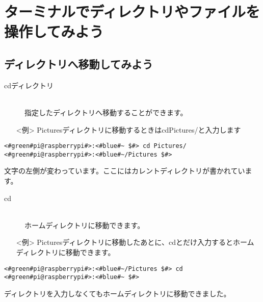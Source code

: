 \section{ターミナルでディレクトリやファイルを操作してみよう}

\subsection{ディレクトリへ移動してみよう}
\begin{description}
\item[cd\textvisiblespace ディレクトリ]\mbox{}\\
指定したディレクトリへ移動することができます。
\end{description}
\begin{itemize}
\item[<例>] Picturesディレクトリに移動するときはcd\textvisiblespace Pictures/と入力します
\end{itemize}

\begin{lstlisting}[caption=cd directoryの例, label=cdDir]
<#green#pi@raspberrypi#>:<#blue#~ $#> cd Pictures/
<#green#pi@raspberrypi#>:<#blue#~/Pictures $#>
\end{lstlisting}
文字の左側が変わっています。ここにはカレントディレクトリが書かれています。

\begin{description}
\item[cd]\mbox{}\\
ホームディレクトリに移動できます。
\end{description}
\begin{itemize}
\item[<例>] Picturesディレクトリに移動したあとに、cdとだけ入力するとホームディレクトリに移動できます。
\end{itemize}
\begin{lstlisting}[caption=cdの例, label=cd]
<#green#pi@raspberrypi#>:<#blue#~/Pictures $#> cd
<#green#pi@raspberrypi#>:<#blue#~ $#> 
\end{lstlisting}
ディレクトリを入力しなくてもホームディレクトリに移動できました。\\

\begin{tcolorbox}[title=\useOmetoi]
\begin{enumerate}
\end{enumerate}
\end{tcolorbox}
